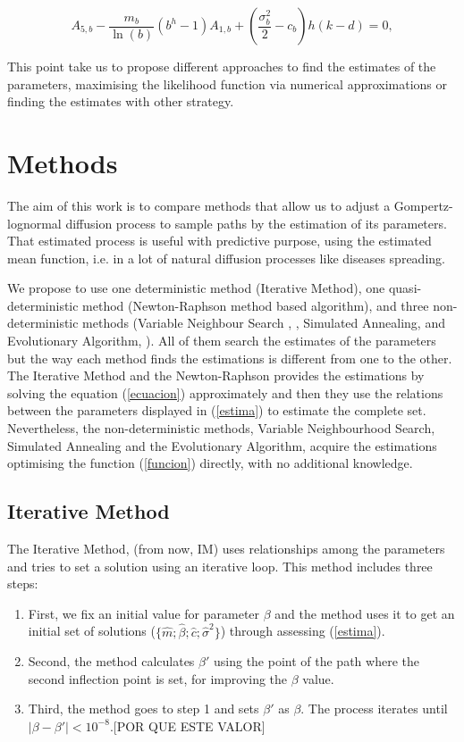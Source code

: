 \documentclass{sig-alternate}
\begin{document}
\begin{equation}\label{ecuacion}
    A_{5,b}-\frac{m_b}{\ln(b)}(b^h-1)A_{1,b}+\left(\frac{\sigma_b^2}{2}-c_b\right)h(k-d)=0 ,
\end{equation}

This point take us to propose different approaches to find the estimates of the parameters, maximising the likelihood function via numerical approximations or finding the estimates with other strategy. 


\section{Methods}
\label{sec:methods}

The aim of this work is to compare methods that allow us to adjust a
Gompertz-lognormal diffusion process to sample paths by the estimation
of its parameters. That estimated process is useful with predictive
purpose, using the estimated mean function, i.e. in a lot of natural
diffusion processes like diseases spreading. 

We propose to use one deterministic method (Iterative Method), one quasi-deterministic method (Newton-Raphson method based algorithm), and three non-deterministic methods (Variable Neighbour Search , \cite{VNS}, Simulated Annealing, \cite{SA} and Evolutionary Algorithm, \cite{EA}). All of them search the estimates of the parameters but the way each method finds the estimations is different from one to the other. The Iterative Method and the Newton-Raphson  provides the estimations by solving the equation (\ref{ecuacion}) approximately and then they use the relations between the parameters displayed in (\ref{estima}) to estimate the complete set. Nevertheless, the non-deterministic methods, Variable Neighbourhood Search, Simulated Annealing and the Evolutionary Algorithm, acquire the estimations optimising the function (\ref{funcion}) directly, with no additional knowledge.


\subsection{Iterative Method}
\label{subsec:iterative}
The Iterative Method, (from now, IM) uses relationships among the parameters and tries to set a solution using an iterative loop.  This method includes three steps:

\begin{enumerate}
\item First, we fix an initial value for parameter $\beta$ and the method uses it to get an initial set of solutions ($\{\hat{m}; \hat{\beta}; \hat{c}; \hat{\sigma}^2\}$) through assessing (\ref{estima}).
\item Second, the method calculates $\beta'$ using the point of the path where the second inflection point is set, for improving the $\beta$ value.
\item Third,  the method goes to step 1 and sets $\beta'$ as $\beta$. The process iterates until $|\beta-\beta'|<10^{-8}$.[POR QUE ESTE VALOR]

\end{enumerate}
\end{document}
